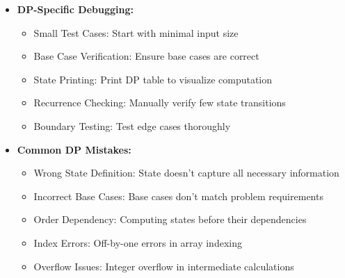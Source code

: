 \documentclass[a4paper,10pt]{book}
\begin{document}
\begin{itemize}[leftmargin=*]
    \item \textbf{DP-Specific Debugging:}
    \begin{itemize}
        \item Small Test Cases: Start with minimal input size
        \item Base Case Verification: Ensure base cases are correct
        \item State Printing: Print DP table to visualize computation
        \item Recurrence Checking: Manually verify few state transitions
        \item Boundary Testing: Test edge cases thoroughly
    \end{itemize}

    \item \textbf{Common DP Mistakes:}
    \begin{itemize}
        \item Wrong State Definition: State doesn't capture all necessary information
        \item Incorrect Base Cases: Base cases don't match problem requirements
        \item Order Dependency: Computing states before their dependencies
        \item Index Errors: Off-by-one errors in array indexing
        \item Overflow Issues: Integer overflow in intermediate calculations
    \end{itemize}
\end{itemize}
\end{document}
